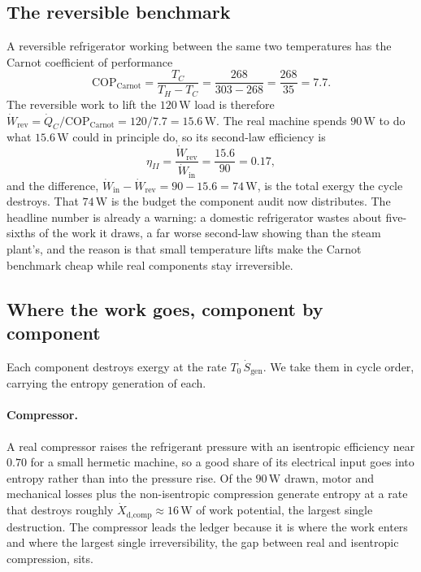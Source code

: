 \subsection{The reversible benchmark}

A reversible refrigerator working between the same two temperatures has
the Carnot coefficient of performance
\[
\mathrm{COP}_{\text{Carnot}} = \frac{T_C}{T_H - T_C}
= \frac{268}{303 - 268} = \frac{268}{35} = 7.7.
\]
The reversible work to lift the $120\,\text{W}$ load is therefore $\dot
W_{\text{rev}} = \dot Q_C/\mathrm{COP}_{\text{Carnot}} = 120/7.7 =
15.6\,\text{W}$. The real machine spends $90\,\text{W}$ to do what
$15.6\,\text{W}$ could in principle do, so its second-law efficiency is
\[
\eta_{II} = \frac{\dot W_{\text{rev}}}{\dot W_{\text{in}}}
= \frac{15.6}{90} = 0.17,
\]
and the difference, $\dot W_{\text{in}} - \dot W_{\text{rev}} = 90 - 15.6
= 74\,\text{W}$, is the total exergy the cycle destroys. That $74\,\text{W}$
is the budget the component audit now distributes. The headline number is
already a warning: a domestic refrigerator wastes about five-sixths of
the work it draws, a far worse second-law showing than the steam plant's,
and the reason is that small temperature lifts make the Carnot benchmark
cheap while real components stay irreversible.

\subsection{Where the work goes, component by component}

Each component destroys exergy at the rate $T_0\,\dot S_{\text{gen}}$.
We take them in cycle order, carrying the entropy generation of each.

\paragraph{Compressor.} A real compressor raises the refrigerant
pressure with an isentropic efficiency near $0.70$ for a small hermetic
machine, so a good share of its electrical input goes into entropy rather
than into the pressure rise. Of the $90\,\text{W}$ drawn, motor and
mechanical losses plus the non-isentropic compression generate entropy at
a rate that destroys roughly $\dot X_{\text{d,comp}} \approx 16\,\text{W}$
of work potential, the largest single destruction. The compressor leads
the ledger because it is where the work enters and where the largest
single irreversibility, the gap between real and isentropic compression,
sits.

